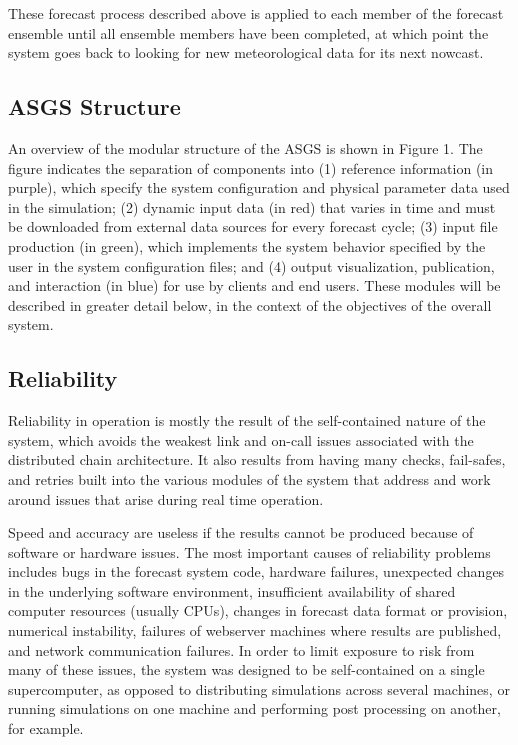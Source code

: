 \documentclass[12pt]{article}
\begin{document}
These forecast process described above is applied to  each member of 
the forecast ensemble until all ensemble members have been 
completed, at which point the system goes back to looking for new 
meteorological data for its next nowcast.


\subsection{ASGS Structure}

An overview of the modular structure of the ASGS is shown in Figure 
1. The figure indicates the separation of components into (1) 
reference information (in purple), which specify the system 
configuration and physical parameter data used in the simulation; 
(2) dynamic input data (in red) that varies in time and must be 
downloaded from external data sources for every forecast cycle; (3) 
input file production (in green), which implements the system 
behavior specified by the user in the system configuration files; 
and (4) output visualization, publication, and interaction (in blue) 
for use by clients and end users. These modules will be described in 
greater detail below, in the context of the objectives of the
overall system. 

\subsection{Reliability}

Reliability in operation is mostly the result of the self-contained 
nature of the system, which avoids the weakest link and on-call 
issues associated with the distributed chain architecture. It also 
results from having many checks, fail-safes, and retries built into 
the various modules of the system that address and work around issues
that arise during real time operation. 

Speed and accuracy are useless if the results cannot be produced 
because of software or hardware issues. The most important causes of 
reliability problems includes bugs in the forecast system code, 
hardware failures, unexpected changes in the underlying software 
environment, insufficient availability of shared computer resources 
(usually CPUs), changes in forecast data format or provision, 
numerical instability, failures of webserver machines where results 
are published, and network communication failures. In order to limit 
exposure to risk from many of these issues, the system was designed 
to be self-contained on a single supercomputer, as opposed to 
distributing simulations across several machines, or running 
simulations on one machine and performing post processing on 
another, for example. 
\end{document}

